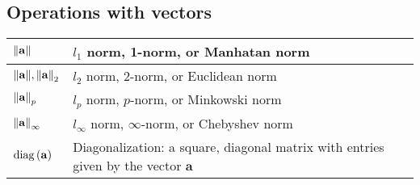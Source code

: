 \documentclass{article}
\begin{document}
\subsection{Operations with vectors}
\begin{xltabular}{\textwidth}{XX}
    \(\norm{\mathbf{a}}\) & \(l_1\) norm, 1-norm, or Manhatan norm\\ \hline
    \(\norm{\mathbf{a}}, \norm{\mathbf{a}}_2\) & \(l_2\) norm, 2-norm, or Euclidean norm\\ \hline
    \(\norm{\mathbf{a}}_p\) & \(l_p\) norm, \(p\)-norm, or Minkowski norm\\ \hline
    \(\norm{\mathbf{a}}_\infty\) & \(l_\infty\) norm, \(\infty\)-norm, or Chebyshev norm\\ \hline
    \(\operatorname{diag}\left(\mathbf{a}\right)\) & Diagonalization: a square, diagonal matrix with entries given by the vector \(\mathbf{a}\)\\
\end{xltabular}
\end{document}
